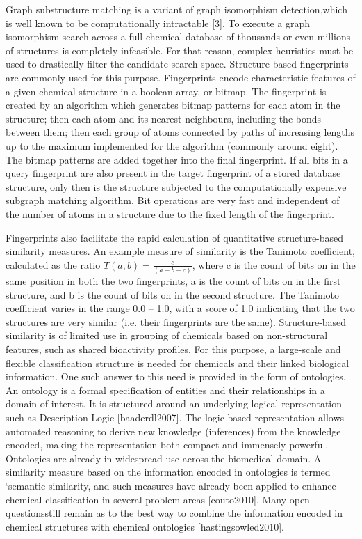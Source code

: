 \documentclass{sig-alternate}
\begin{document}
Graph substructure matching is a variant of graph isomorphism detection,which is
well known to be computationally intractable [3]. To execute a graph isomorphism
search across a full chemical database of thousands or even millions of
structures is completely infeasible. For that reason, complex heuristics must be
used to drastically filter the candidate search space. Structure-based
fingerprints are commonly used for this purpose. Fingerprints encode
characteristic features of a given chemical structure in a boolean array, or
bitmap. The fingerprint is created by an algorithm which generates bitmap
patterns for each atom in the structure; then each atom and its nearest
neighbours, including the bonds between them; then each group of atoms connected
by paths of increasing lengths up to the maximum implemented for the algorithm
(commonly around eight). The bitmap patterns are added together into the final
fingerprint. If all bits in a query fingerprint are also present in the target
fingerprint of a stored database structure, only then is the structure subjected
to the computationally expensive subgraph matching algorithm. Bit operations are
very fast and independent of the number of atoms in a structure due to the fixed
length of the fingerprint.

Fingerprints also facilitate the rapid calculation of quantitative
structure-based similarity measures. An example measure of similarity is the
Tanimoto coefficient, calculated as the ratio $T(a,b) = \frac{c}{(a+b−c)}$,
where c is the count of bits on in the same position in both the two
fingerprints, a is the count of bits on in the first structure, and b is the
count of bits on in the second structure. The Tanimoto coefficient varies in the
range 0.0 -- 1.0, with a score of 1.0 indicating that the two structures are very
similar (i.e. their fingerprints are the same). Structure-based similarity is of
limited use in grouping of chemicals based on non-structural features, such as
shared bioactivity profiles. For this purpose, a large-scale and flexible
classification structure is needed for chemicals and their linked biological
information. One such answer to this need is provided in the form of ontologies.
An ontology is a formal specification of entities and their relationships in a
domain of interest. It is structured around an underlying logical representation
such as Description Logic [baaderdl2007]. The logic-based representation allows
automated reasoning to derive new knowledge (inferences) from the knowledge
encoded, making the representation both compact and immensely powerful.
Ontologies are already in widespread use across the biomedical domain. A
similarity measure based on the information encoded in ontologies is termed
‘semantic similarity, and such measures have already been applied to enhance
chemical classification in several problem areas [couto2010]. Many open
questionsstill remain as to the best way to combine the information encoded in
chemical structures with chemical ontologies [hastingsowled2010].
\end{document}
